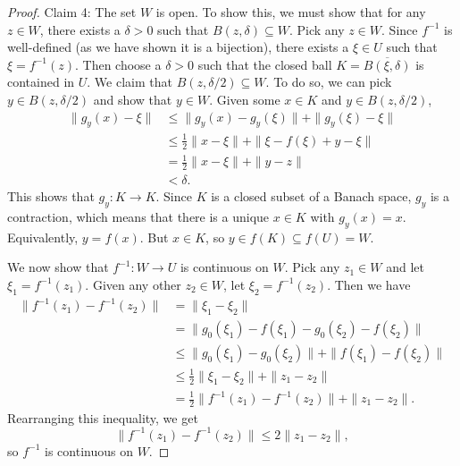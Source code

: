 \documentclass[11pt]{article}
\theoremstyle{definition}
\begin{document}
\begin{proof}
    Claim 4: The set $W$ is open. To show this, we must show that for any $z\in W$, there exists a $\delta>0$ such that $B(z,\delta)\subseteq W$. Pick any $z\in W$. Since $f^{-1}$ is well-defined (as we have shown it is a bijection), there exists a $\xi\in U$ such that $\xi=f^{-1}(z)$. Then choose a $\delta >0$ such that the closed ball $K=\overline{B(\xi,\delta)}$ is contained in $U$. We claim that $B(z,\delta/2)\subseteq W$. To do so, we can pick $y\in B(z,\delta/2)$ and show that $y\in W$. Given some $x\in K$ and $y\in B(z,\delta/2)$, 
    $$
    \begin{aligned}
        \|g_y(x)-\xi\|&\leq \|g_y(x)-g_y(\xi)\|+\|g_y(\xi)-\xi\|\\
        &\leq \frac{1}{2}\|x-\xi\|+\|\xi-f(\xi)+y-\xi\|\\
        &=\frac{1}{2}\|x-\xi\|+\|y-z\|\\
        &<\delta.
    \end{aligned}
    $$ 
    This shows that $g_y:K\to K$. Since $K$ is a closed subset of a Banach space, $g_y$ is a contraction, which means that there is a unique $x\in K$ with $g_y(x)=x$. Equivalently, $y=f(x)$. But $x\in K$, so $y\in f(K)\subseteq f(U)=W$. 

    We now show that $f^{-1}:W\to U$ is continuous on $W$. Pick any $z_1\in W$ and let $\xi_1=f^{-1}(z_1)$. Given any other $z_2\in W$, let $\xi_2=f^{-1}(z_2)$. Then we have
    $$
    \begin{aligned}
        \|f^{-1}(z_1)-f^{-1}(z_2)\|&=\|\xi_1-\xi_2\|\\
        &=\|g_0(\xi_1)-f(\xi_1)-g_0(\xi_2)-f(\xi_2)\|\\
        &\leq\|g_0(\xi_1)-g_0(\xi_2)\|+\|f(\xi_1)-f(\xi_2)\|\\
        &\leq \frac{1}{2}\|\xi_1-\xi_2\|+\|z_1-z_2\|\\
        &=\frac{1}{2}\|f^{-1}(z_1)-f^{-1}(z_2)\|+\|z_1-z_2\|.
    \end{aligned}
    $$
    Rearranging this inequality, we get
    \begin{equation}
    \|f^{-1}(z_1)-f^{-1}(z_2)\|\leq 2\|z_1-z_2\|,
    \end{equation}
    so $f^{-1}$ is continuous on $W$.


\end{proof}
\end{document}
